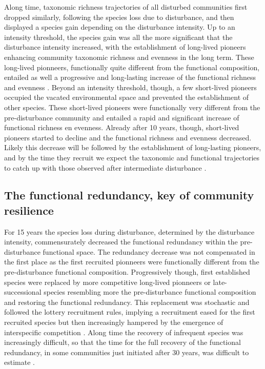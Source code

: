\documentclass[fleqn,10pt]{ArtEcoFoG} %
\begin{document}
Along time, taxonomic richness trajectories of all disturbed communities
first dropped similarly, following the species loss due to disturbance,
and then displayed a species gain depending on the disturbance
intensity. Up to an intensity threshold, the species gain was all the
more significant that the disturbance intensity increased, with the
establishment of long-lived pioneers enhancing community taxonomic
richness and evenness in the long term. These long-lived pionneers,
functionally quite different from the functional composition, entailed
as well a progressive and long-lasting increase of the functional
richness and evenness \citep{Denslow1980, Molino2001}. Beyond an
intensity threshold, though, a few short-lived pioneers occupied the
vacated environmental space and prevented the establishment of other
species. These short-lived pioneers were functionally very different
from the pre-disturbance community and entailed a rapid and significant
increase of functional richness en evenness. Already after 10 years,
though, short-lived pioneers started to decline and the functional
richness and evenness decreased. Likely this decrease will be followed
by the establishment of long-lasting pioneers, and by the time they
recruit we expect the taxonomic and functional trajectories to catch up
with those observed after intermediate disturbance
\citep{Anderson2007, Walker2009}.

\subsection{The functional redundancy, key of community
resilience}\label{the-functional-redundancy-key-of-community-resilience}

For 15 years the species loss during disturbance, determined by the
disturbance intensity, commensurately decreased the functional
redundancy within the pre-disturbance functional space. The redundancy
decrease was not compensated in the first place as the first recruited
pionneers were functionally different from the pre-disturbance
functional composition. Progressively though, first established species
were replaced by more competitive long-lived pionneers or
late-successional species resembling more the pre-disturbance functional
composition and restoring the functional redundancy. This replacement
was stochastic and followed the lottery recruitment rules, implying a
recruitment eased for the first recruited species but then increasingly
hampered by the emergence of interspecific competition
\citep{Busing2002}. Along time the recovery of infrequent species was
increasingly difficult, so that the time for the full recovery of the
functional redundancy, in some communities just initiated after 30
years, was difficult to estimate
\citep{Trenbath1999, Elmqvist2003, Diaz2005}.
\end{document}
